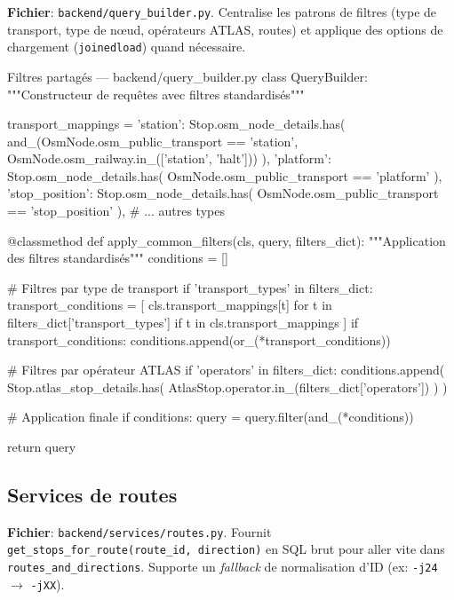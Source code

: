 \textbf{Fichier}: \texttt{backend/query\_builder.py}. Centralise les patrons de filtres (type de transport, type de nœud, opérateurs ATLAS, routes) et applique des options de chargement (\texttt{joinedload}) quand nécessaire.

\begin{codebox}[language=Python]{Filtres partagés — backend/query\_builder.py}
class QueryBuilder:
    """Constructeur de requêtes avec filtres standardisés"""
    
    transport_mappings = {
        'station': Stop.osm_node_details.has(
            and_(OsmNode.osm_public_transport == 'station',
                 OsmNode.osm_railway.in_(['station', 'halt']))
        ),
        'platform': Stop.osm_node_details.has(
            OsmNode.osm_public_transport == 'platform'
        ),
        'stop_position': Stop.osm_node_details.has(
            OsmNode.osm_public_transport == 'stop_position'
        ),
        # ... autres types
    }
    
    @classmethod
    def apply_common_filters(cls, query, filters_dict):
        """Application des filtres standardisés"""
        conditions = []
        
        # Filtres par type de transport
        if 'transport_types' in filters_dict:
            transport_conditions = [
                cls.transport_mappings[t] 
                for t in filters_dict['transport_types']
                if t in cls.transport_mappings
            ]
            if transport_conditions:
                conditions.append(or_(*transport_conditions))
        
        # Filtres par opérateur ATLAS
        if 'operators' in filters_dict:
            conditions.append(
                Stop.atlas_stop_details.has(
                    AtlasStop.operator.in_(filters_dict['operators'])
                )
            )
        
        # Application finale
        if conditions:
            query = query.filter(and_(*conditions))
        
        return query
\end{codebox}

\subsection*{Services de routes}

\textbf{Fichier}: \texttt{backend/services/routes.py}. Fournit \texttt{get\_stops\_for\_route(route\_id, direction)} en SQL brut pour aller vite dans \texttt{routes\_and\_directions}. Supporte un \textit{fallback} de normalisation d'ID (ex: \texttt{-j24} $\rightarrow$ \texttt{-jXX}).


